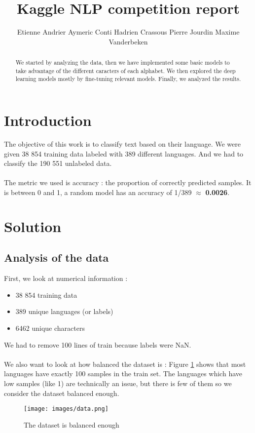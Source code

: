 \documentclass[11pt]{article}
\title{Kaggle NLP competition report}
\author{Etienne Andrier \And Aymeric Conti \And Hadrien Crassous \AND Pierre Jourdin \And Maxime Vanderbeken}
\begin{document}
\maketitle
\begin{abstract}
We started by analyzing the data, then we have implemented some basic models to take advantage of the different caracters of each alphabet. We then explored the deep learning models mostly by fine-tuning relevant models. Finally, we analyzed the results.
\end{abstract}

\section{Introduction}

The objective of this work is to classify text based on their language. We were given 38 854 training data labeled with 389 different languages. And we had to classify the 190 551 unlabeled data.
\\
\\
The metric we used is accuracy : the proportion of correctly predicted samples. It is between 0 and 1, a random model has an accuracy of 1/389 $\approx$ \textbf{0.0026}.

\section{Solution}

\subsection{Analysis of the data}
First, we look at numerical information :
\begin{itemize}[noitemsep, topsep=0pt]
    \item 38 854 training data
    \item 389 unique languages (or labels)
    \item 6462 unique characters
\end{itemize}
We had to remove 100 lines of train because labels were NaN.
\\\\
We also want to look at how balanced the dataset is : Figure \ref{fig:data} shows that most languages have exactly 100 samples in the train set. The languages which have low samples (like 1) are technically an issue, but there is few of them so we consider the dataset balanced enough.

\begin{figure}[h]
    \centering
    \texttt{[image: images/data.png]}  %
    \caption{The dataset is balanced enough}
    \label{fig:data}
\end{figure}
\end{document}
